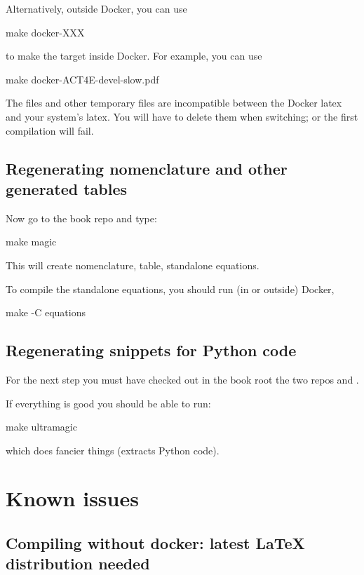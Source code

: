 Alternatively, outside Docker, you can use
\begin{console}
    make docker-XXX
\end{console}
to make the target  inside Docker.
For example, you can use
\begin{console}
    make docker-ACT4E-devel-slow.pdf
\end{console}
%

\begin{remark}
    The  files and other temporary files are incompatible between the Docker latex and your system's latex.
    You will have to delete them when switching; or the first compilation will fail.
\end{remark}

\subsection{Regenerating nomenclature and other generated tables}

Now go to the book repo and type:
%
\begin{console}
    make magic
\end{console}
%
This will create nomenclature, table, standalone equations.

To compile the standalone equations, you should run (in or outside) Docker,
%
\begin{console}
    make -C equations
\end{console}

\subsection{Regenerating snippets for Python code}

For the next step you must have checked out in the book root the two repos  and .

If everything is good you should be able to run:
%
\begin{console}
    make ultramagic
\end{console}
%
which does fancier things (extracts Python code).

\section{Known issues}

\subsection{Compiling without docker: latest LaTeX distribution needed}

